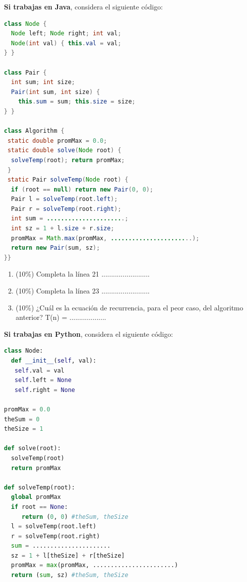 \documentclass[10 pt]{article}
\begin{document}
\textbf{Si trabajas en Java}, considera el siguiente código:

{\small
\begin{lstlisting}[language=java]
class Node {
  Node left; Node right; int val;
  Node(int val) { this.val = val;
} } 

class Pair {
  int sum; int size;
  Pair(int sum, int size) {
    this.sum = sum; this.size = size;
} }

class Algorithm {
 static double promMax = 0.0;
 static double solve(Node root) {
  solveTemp(root); return promMax;
 }
 static Pair solveTemp(Node root) {
  if (root == null) return new Pair(0, 0);
  Pair l = solveTemp(root.left);
  Pair r = solveTemp(root.right);
  int sum = ......................;
  int sz = 1 + l.size + r.size;
  promMax = Math.max(promMax, .......................);
  return new Pair(sum, sz);
}}
\end{lstlisting}
}

\begin{enumerate}[label=(\Alph*)]
\item (10\%) Completa la línea 21 .........................
\item (10\%) Completa la línea 23 .........................
\item (10\%) ¿Cuál es la ecuación de recurrencia, para el peor caso, del algoritmo anterior? T(n) = ...................
\end{enumerate}

\newpage

\textbf{Si trabajas en Python}, considera el siguiente código:

{\small
\begin{lstlisting}[language=python]
class Node:
  def __init__(self, val):
   self.val = val
   self.left = None
   self.right = None 

promMax = 0.0
theSum = 0
theSize = 1

def solve(root):
  solveTemp(root) 
  return promMax
 
def solveTemp(root):
  global promMax
  if root == None: 
     return (0, 0) #theSum, theSize
  l = solveTemp(root.left)
  r = solveTemp(root.right)
  sum = ......................
  sz = 1 + l[theSize] + r[theSize]
  promMax = max(promMax, .......................)
  return (sum, sz) #theSum, theSize

\end{lstlisting}
}
\end{document}
